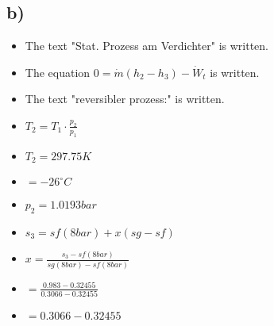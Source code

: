 

\subsection*{b)}

\begin{itemize}
    \item The text "Stat. Prozess am Verdichter" is written.
    \item The equation $0 = \dot{m}(h_2 - h_3) - \dot{W}_t$ is written.
    \item The text "reversibler prozess:" is written.
    \item $T_2 = T_1 \cdot \frac{p_2}{p_1}$
    \item $T_2 = 297.75K$
    \item $= -26^\circ C$
    \item $p_2 = 1.0193bar$
    \item $s_3 = sf(8bar) + x(sg - sf)$
    \item $x = \frac{s_3 - sf(8bar)}{sg(8bar) - sf(8bar)}$
    \item $= \frac{0.983 - 0.32455}{0.3066 - 0.32455}$
    \item $= 0.3066 - 0.32455$
\end{itemize}